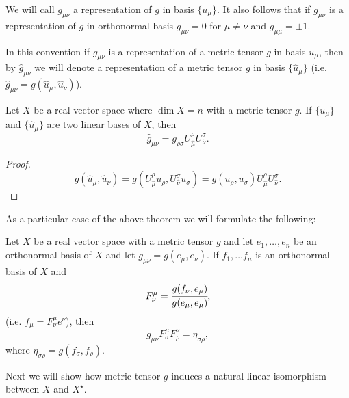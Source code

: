 \documentclass[main.tex]{subfiles}
\begin{document}
We will call $g_{\mu\nu}$ a representation of $g$ in basis $\{u_\mu\}$. It also follows that if $g_{\mu\nu}$ is a representation of $g$ in orthonormal basis 
$g_{\mu\nu} = 0$ 
for $\mu\not=\nu$ 
and $g_{\mu\mu} = \pm 1$.

In this convention if $g_{\mu\nu}$ is a representation of a metric tensor $g$ in basis $u_\mu$, then by $\hat{g}_{\mu\nu}$ we will denote a representation of a metric tensor $g$ in basis $\{\hat{u}_\mu\}$ (i.e. $\hat{g}_{\mu\nu} = g(\hat{u}_\mu, \hat{u}_\nu)$).

\begin{theorem}
\label{metric-transformation}
Let $X$ be a real vector space where $\dim X = n$ with a metric tensor $g$. If $\{u_\mu\}$ and $\{\hat{u}_\mu\}$ are two linear bases of $X$, then
\begin{equation}
\hat{g}_{\mu\nu} = g_{\rho\sigma} U^{\rho}_{\hat{\mu}} U^{\sigma}_{\hat{\nu}}.
\end{equation}
\end{theorem}
\begin{proof}
\begin{equation}
g(\hat{u}_\mu, \hat{u}_\nu) = g(U^{\rho}_{\hat{\mu}} u_\rho, U^{\sigma}_{\hat{\nu}} u_\sigma) = 
g(u_\rho, u_\sigma)  U^{\rho}_{\hat{\mu}} U^{\sigma}_{\hat{\nu}}.
\end{equation}
\end{proof}

As a particular case of the above theorem we will formulate the following: 

\begin{theorem}
Let $X$ be a real vector space with a metric tensor $g$ and let $e_1, \dots, e_n$ be an orthonormal basis of $X$ and let $g_{\mu\nu} = g(e_\mu, e_\nu)$. If $f_1, \dots f_n$ is an orthonormal basis of $X$ and
\begin{equation}
F^\mu_\nu = \cfrac{g(f_\nu, e_\mu)}{g(e_\mu, e_\mu)}, 
\end{equation} 
(i.e. $f_\mu = F^\mu_\nu e^\nu$), then
\begin{equation}
g_{\mu\nu} F^\mu_\sigma F^\nu_\rho = \eta_{\sigma\rho},
\end{equation}
where $\eta_{\sigma\rho} = g(f_\sigma, f_\rho)$. 
\end{theorem}

Next we will show how metric tensor $g$ induces a natural linear isomorphism between $X$ and $X^\star$.
\end{document}
